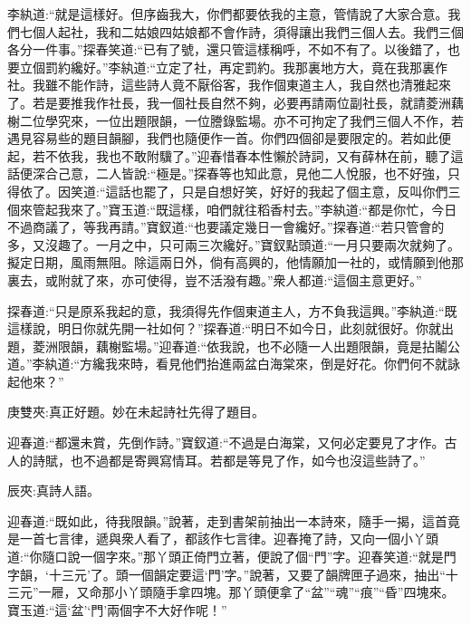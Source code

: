 \begin{parag}
    李紈道:“就是這樣好。但序齒我大，你們都要依我的主意，管情說了大家合意。我們七個人起社，我和二姑娘四姑娘都不會作詩，須得讓出我們三個人去。我們三個各分一件事。”探春笑道:“已有了號，還只管這樣稱呼，不如不有了。以後錯了，也要立個罰約纔好。”李紈道:“立定了社，再定罰約。我那裏地方大，竟在我那裏作社。我雖不能作詩，這些詩人竟不厭俗客，我作個東道主人，我自然也清雅起來了。若是要推我作社長，我一個社長自然不夠，必要再請兩位副社長，就請菱洲藕榭二位學究來，一位出題限韻，一位謄錄監場。亦不可拘定了我們三個人不作，若遇見容易些的題目韻腳，我們也隨便作一首。你們四個卻是要限定的。若如此便起，若不依我，我也不敢附驥了。”迎春惜春本性懶於詩詞，又有薛林在前，聽了這話便深合己意，二人皆說:“極是。”探春等也知此意，見他二人悅服，也不好強，只得依了。因笑道:“這話也罷了，只是自想好笑，好好的我起了個主意，反叫你們三個來管起我來了。”寶玉道:“既這樣，咱們就往稻香村去。”李紈道:“都是你忙，今日不過商議了，等我再請。”寶釵道:“也要議定幾日一會纔好。”探春道:“若只管會的多，又沒趣了。一月之中，只可兩三次纔好。”寶釵點頭道:“一月只要兩次就夠了。擬定日期，風雨無阻。除這兩日外，倘有高興的，他情願加一社的，或情願到他那裏去，或附就了來，亦可使得，豈不活潑有趣。”衆人都道:“這個主意更好。”
\end{parag}


\begin{parag}
    探春道:“只是原系我起的意，我須得先作個東道主人，方不負我這興。”李紈道:“既這樣說，明日你就先開一社如何？”探春道:“明日不如今日，此刻就很好。你就出題，菱洲限韻，藕榭監場。”迎春道:“依我說，也不必隨一人出題限韻，竟是拈鬮公道。”李紈道:“方纔我來時，看見他們抬進兩盆白海棠來，倒是好花。你們何不就詠起他來？”\begin{note}庚雙夾:真正好題。妙在未起詩社先得了題目。\end{note}迎春道:“都還未賞，先倒作詩。”寶釵道:“不過是白海棠，又何必定要見了才作。古人的詩賦，也不過都是寄興寫情耳。若都是等見了作，如今也沒這些詩了。”\begin{note}辰夾:真詩人語。\end{note}迎春道:“既如此，待我限韻。”說著，走到書架前抽出一本詩來，隨手一揭，這首竟是一首七言律，遞與衆人看了，都該作七言律。迎春掩了詩，又向一個小丫頭道:“你隨口說一個字來。”那丫頭正倚門立著，便說了個“門”字。迎春笑道:“就是門字韻，‘十三元’了。頭一個韻定要這‘門’字。”說著，又要了韻牌匣子過來，抽出“十三元”一屜，又命那小丫頭隨手拿四塊。那丫頭便拿了“盆”“魂”“痕”“昏”四塊來。寶玉道:“這‘盆’‘門’兩個字不大好作呢！”
\end{parag}


